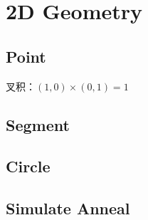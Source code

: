 \newpage
\section{2D Geometry}
	\subsection{Point}
		\begin{flushleft}
			叉积：$(1, 0) \times (0, 1) = 1$
		\end{flushleft}
		
	\subsection{Segment}
		
	\subsection{Circle}
		
	\subsection{Simulate Anneal}
		
